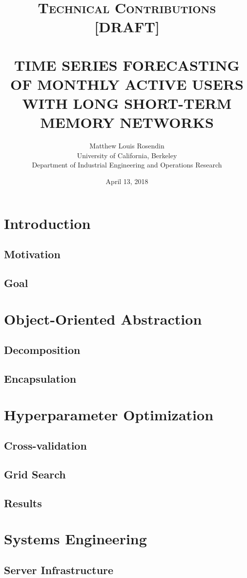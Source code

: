 \documentclass[11pt, oneside]{article}
\title{
  \normalsize \textsc{Technical Contributions [DRAFT]} \\ [2.0cm]
  \HRule{0.5pt} \\
  \LARGE \textbf{\uppercase{
    Time Series Forecasting of Monthly Active Users with Long Short-Term Memory
    Networks
  }}
  \HRule{2pt} \\ [0.5cm]
  \vspace*{5\baselineskip}
}
\author{
  Matthew Louis Rosendin \\
  University of California, Berkeley \\
  Department of Industrial Engineering and Operations Research
}
\date{April 13, 2018}
\begin{document}
\maketitle
\newpage

\tableofcontents
\newpage

\section{Introduction}
\subsection{Motivation}
\subsection{Goal}

\section{Object-Oriented Abstraction}
\subsection{Decomposition}
\subsection{Encapsulation}

\section{Hyperparameter Optimization}
\subsection{Cross-validation}
\subsection{Grid Search}
\subsection{Results}

\section{Systems Engineering}
\subsection{Server Infrastructure}
\end{document}
